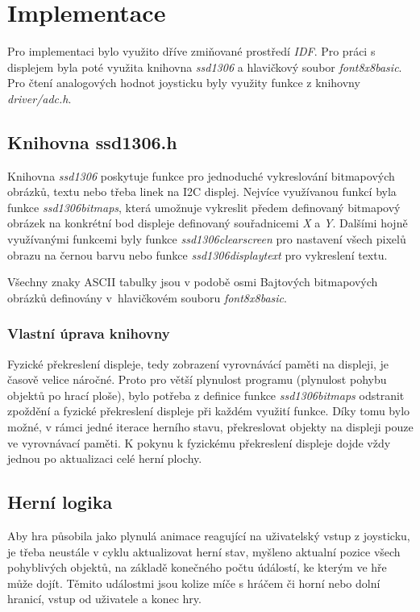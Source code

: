 \documentclass[a4paper, 11pt]{article}
\begin{document}
\newpage



\section{Implementace}
Pro implementaci bylo využito dříve zmiňované prostředí \emph{IDF}. Pro práci s displejem byla poté využita knihovna \emph{ssd1306} a
hlavičkový soubor \emph{font8x8\textunderscore basic}. Pro čtení analogových hodnot joysticku byly využity funkce z knihovny \emph{driver/adc.h}.

\subsection{Knihovna ssd1306.h}
Knihovna \emph{ssd1306} poskytuje funkce pro jednoduché vykreslování bitmapových obrázků, textu nebo třeba linek na I2C displej. Nejvíce využívanou funkcí
byla funkce \emph{ssd1306\textunderscore bitmaps}, která umožnuje vykreslit předem definovaný bitmapový obrázek na konkrétní bod displeje definovaný souřadnicemi \emph{X} a \emph{Y}.
Dalšími hojně využívanými funkcemi byly funkce \emph{ssd1306\textunderscore clear\textunderscore screen} pro nastavení všech pixelů obrazu na černou barvu nebo funkce
\emph{ssd1306\textunderscore display\textunderscore text} pro vykreslení textu.

Všechny znaky ASCII tabulky jsou v podobě osmi Bajtových bitmapových obrázků definovány v~hlavičkovém souboru \emph{font8x8\textunderscore basic}.

\subsubsection{Vlastní úprava knihovny}
Fyzické překreslení displeje, tedy zobrazení vyrovnávácí paměti na displeji, je časově velice náročné.
Proto pro větší plynulost programu (plynulost pohybu objektů po hrací ploše), bylo potřeba z definice funkce \emph{ssd1306\textunderscore bitmaps} odstranit
zpoždění a fyzické překreslení displeje při každém využití funkce. Díky tomu bylo možné, v rámci jedné iterace herního stavu, překreslovat objekty na displeji
pouze ve vyrovnávací paměti. K pokynu k fyzickému překreslení displeje dojde vždy jednou po aktualizaci celé herní plochy.

\subsection{Herní logika}
Aby hra působila jako plynulá animace reagující na uživatelský vstup z joysticku, je třeba neustále v cyklu aktualizovat herní stav, myšleno aktualní pozice všech
pohyblivých objektů, na základě konečného počtu údálostí, ke kterým ve hře může dojít. Těmito událostmi jsou kolize míče s hráčem či horní nebo dolní hranicí, vstup
od uživatele a konec hry.
\end{document}
